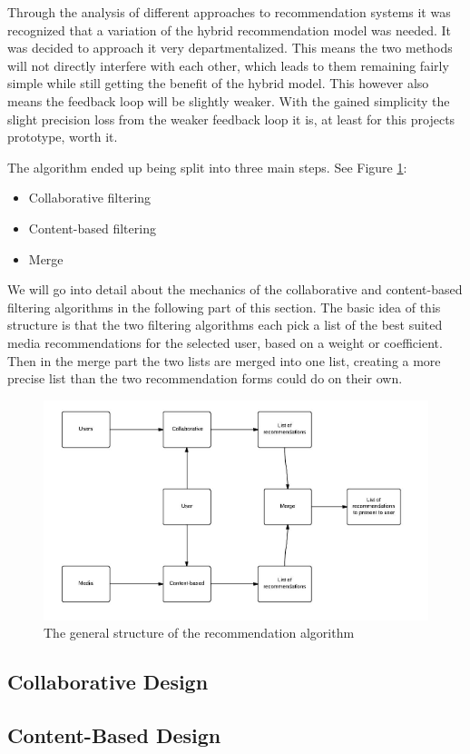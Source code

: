Through the analysis of different approaches to recommendation systems it was recognized that a variation of the hybrid recommendation model was needed. It was decided to approach it very departmentalized. This means the two methods will not directly interfere with each other, which leads to them remaining fairly simple while still getting the benefit of the hybrid model. This however also means the feedback loop will be slightly weaker. With the gained simplicity the slight precision loss from the weaker feedback loop it is, at least for this projects prototype, worth it.

The algorithm ended up being split into three main steps. See Figure \ref{GenRecAlgo}:
\begin{itemize}
	\item Collaborative filtering
	\item Content-based filtering
	\item Merge
\end{itemize}

We will go into detail about the mechanics of the collaborative and content-based filtering algorithms in the following part of this section. The basic idea of this structure is that the two filtering algorithms each pick a list of the best suited media recommendations for the selected user, based on a weight or coefficient. Then in the merge part the two lists are merged into one list, creating a more precise list than the two recommendation forms could do on their own.
\begin{figure}[H]
\centering
\includegraphics[width=1\textwidth]{Images/RecommendationAlgo.png}
\caption{The general structure of the recommendation algorithm}
\label{GenRecAlgo}
\end{figure}


\subsection{Collaborative Design}
\label{CollaborativeDes}

\subsection{Content-Based Design}
\label{ContentBasedDes}
